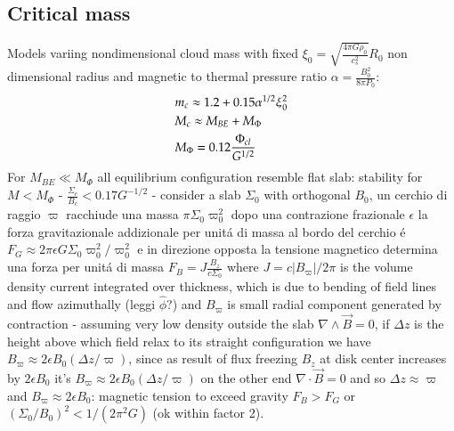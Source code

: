 \documentclass[main.tex]{subfiles}
\begin{document}
\subsection{Critical mass}
Models variing nondimensional cloud mass with fixed $\xi_0=\sqrt{\frac{4\pi G\rho_0}{c_s^2}}R_0$ non dimensional radius and magnetic to thermal pressure ratio $\alpha=\frac{B_0^2}{8\pi P_0}$:
\begin{align*}
&m_c\approx1.2+0.15\alpha^{1/2}\xi_0^2\\
&M_c\approx M_{BE}+M_{\Phi}\\
&M_{\Phi}=0.12\frac{\Phi_{cl}}{G^{1/2}}
\end{align*}
For $M_{BE}\ll M_{\Phi}$ all equilibrium configuration resemble flat slab: stability for $M<M_{\Phi}$ - $\frac{\Sigma_c}{B_c}<0.17G^{-1/2}$ - consider a slab $\Sigma_0$ with orthogonal $B_0$, un cerchio di raggio $\varpi$ racchiude una massa $\pi\Sigma_0\varpi_0^2$ dopo una contrazione frazionale $\epsilon$ la forza gravitazionale addizionale per unit\'a di massa al bordo del cerchio \'e $F_G\approx2\pi\epsilon G\Sigma_0\varpi_0^2/\varpi_0^2$ e in direzione opposta la tensione magnetico determina una forza per unit\'a di massa $F_B=J\frac{B_z}{c\Sigma_0}$ where $J=c|B_{\varpi}|/2\pi$ is the volume density current integrated over thickness, which is due to bending of field lines and flow azimuthally (leggi $\hat{\phi}$?) and $B_{\varpi}$ is small radial component generated by contraction - assuming very low density outside the slab $\nabla\wedge\vec{B}=0$, if $\Delta z$ is the height above which field relax to its straight configuration we have $B_{\varpi}\approx2\epsilon B_0(\Delta z/\varpi)$, since as result of flux freezing $B_z$ at disk center increases by $2\epsilon B_0$ it's $B_{\varpi}\approx2\epsilon B_0(\Delta z/\varpi)$ on the other end $\nabla\cdot\vec{B}=0$  and so $\Delta z\approx\varpi$ and $B_{\varpi}\approx2\epsilon B_0$: magnetic tension to exceed gravity $F_B>F_G$ or $(\Sigma_0/B_0)^2<1/(2\pi^2G)$ (ok within factor 2).
\end{document}
